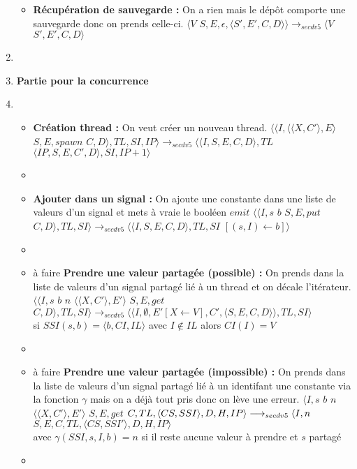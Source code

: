 \documentclass[10pt,a4paper]{article}
\begin{document}
\begin{enumerate}
\begin{itemize}
				\item[] \textbf{Récupération de sauvegarde :}  On a rien mais le dépôt comporte une sauvegarde donc on prends celle-ci.
				\smallbreak  
				$\langle V$ $S,E,\epsilon,\langle S',E',C,D\rangle\rangle
				\longrightarrow_{secdv5} 
				\langle V$ $S',E',C,D\rangle$
			\end{itemize}
			\item[]
			
			
			
			\item[] \textbf{Partie pour la concurrence} 
			\item[]
			\begin{itemize}
				\item[]  \textbf{Création thread :} On veut créer un nouveau thread.
				\smallbreak 
				$\langle\langle I,\langle\langle X,C'\rangle, E\rangle$ $S,E,spawn$ $C,D\rangle,TL,SI,IP\rangle 
				\longrightarrow_{secdv5} 
				\langle\langle I,S,E,C,D\rangle,TL$ $\langle IP,S,E,C',D\rangle,SI,IP+1\rangle$
				\item[]
				
				\item[] \textbf{Ajouter dans un signal :} On ajoute une constante dans une liste de valeurs d'un signal et mets à vraie le booléen $emit$
				\smallbreak
				$\langle\langle I,s$ $b$ $S,E,put$ $C,D\rangle,TL,SI\rangle
				\longrightarrow_{secdv5} 
				\langle\langle I,S,E,C,D\rangle,TL,SI$ $[(s,I) \leftarrow b]\rangle$ 
				\item[]
				
				\item[] à faire \textbf{Prendre une valeur partagée (possible) :} On prends dans la liste de valeurs d'un signal partagé lié à un thread et on décale l'itérateur.
				\smallbreak
				$\langle\langle I,s$ $b$ $n$ $\langle\langle X,C'\rangle,E'\rangle$ $S,E,get$ $C,D\rangle,TL,SI\rangle 
				\longrightarrow_{secdv5} 
				\langle\langle I,\emptyset,E'[X \leftarrow V],C',\langle S,E,C,D\rangle\rangle,TL,SI\rangle$
				\\ si $SSI(s,b) = \langle b,CI,IL\rangle$ avec $I \notin IL$ alors $CI(I) = V$
				\item[]
				
				\item[] à faire \textbf{Prendre une valeur partagée (impossible) :} On prends dans la liste de valeurs d'un signal partagé lié à un identifant une constante via la fonction $\gamma$ mais on a déjà tout pris donc on lève une erreur.
				\smallbreak 
				$\langle I,s$ $b$ $n$ $\langle\langle X,C'\rangle,E'\rangle$ $S,E,get$ $C,TL,\langle CS,SSI\rangle,D,H,IP\rangle 
				\\\longrightarrow_{secdv5} 
				\langle I,n$ $S,E,C,TL,\langle CS,SSI'\rangle,D,H,IP\rangle$
				\\avec $ \gamma(SSI,s,I,b) = n$ si il reste aucune valeur à prendre et $s$ partagé
				\item[]
				

\end{itemize}
\end{enumerate}
\end{document}
